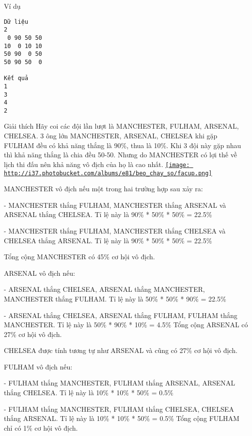Ví dụ
\begin{verbatim}
Dữ liệu
2
 0 90 50 50
10  0 10 10
50 90  0 50
50 90 50  0

Kết quả
1
3
4
2
\end{verbatim}
Giải thích
Hãy coi các đội lần lượt là MANCHESTER, FULHAM, ARSENAL, CHELSEA. 3 ông lớn MANCHESTER, ARSENAL, CHELSEA khi gặp FULHAM đều có khả năng thắng là 90\%, thua là 10\%. Khi 3 đội này gặp nhau thì khả năng thắng là chia đều 50-50. Nhưng do MANCHESTER có lợi thế về lịch thi đấu nên khả năng vô địch của họ là cao nhất.  \href{http://s37.photobucket.com/albums/e81/beo_chay_so/?action=view¤t=facup.png}{
\texttt{[image: http://i37.photobucket.com/albums/e81/beo\_chay\_so/facup.png]}}

   MANCHESTER vô địch nếu một trong hai trường hợp sau xảy ra:  

   - MANCHESTER thắng FULHAM, MANCHESTER thắng ARSENAL và ARSENAL thắng CHELSEA. Tỉ lệ này là 90\% * 50\% * 50\% = 22.5\%  

   - MANCHESTER thắng FULHAM, MANCHESTER thắng CHELSEA và CHELSEA thắng ARSENAL. Tỉ lệ này là 90\% * 50\% * 50\% = 22.5\%  

   Tổng cộng MANCHESTER có 45\% cơ hội vô địch.  

   ARSENAL vô địch nếu:  

   - ARSENAL thắng CHELSEA, ARSENAL thắng MANCHESTER, MANCHESTER thắng FULHAM. Tỉ lệ này là 50\% * 50\% * 90\% = 22.5\%  

   - ARSENAL thắng CHELSEA, ARSENAL thắng FULHAM, FULHAM thắng MANCHESTER. Tỉ lệ này là 50\% * 90\% * 10\% = 4.5\% Tổng cộng ARSENAL có 27\% cơ hội vô địch.  

   CHELSEA được tính tương tự như ARSENAL và cũng có 27\% cơ hội vô địch.  

   FULHAM vô địch nếu:  

   - FULHAM thắng MANCHESTER, FULHAM thắng ARSENAL, ARSENAL thắng CHELSEA. Tỉ lệ này là 10\% * 10\% * 50\% = 0.5\%  

   - FULHAM thắng MANCHESTER, FULHAM thắng CHELSEA, CHELSEA thắng ARSENAL. Tỉ lệ này là 10\% * 10\% * 50\% = 0.5\% Tổng cộng FULHAM chỉ có 1\% cơ hội vô địch.